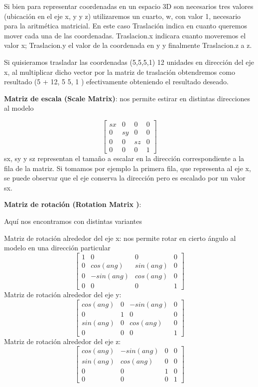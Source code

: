 \documentclass[a4paper]{article}
\begin{document}
Si bien para representar  coordenadas en un espacio 3D son necesarios tres valores (ubicación en el eje x, y y z) utilizaremos un cuarto, w, con valor 1, necesario para la aritmética matricial. En este caso Traslación indica en cuanto queremos mover cada una de las coordenadas. Traslacion.x indicara cuanto moveremos el valor x;  Traslacion.y el valor de la coordenada en y y finalmente Traslacion.z a z.
\par Si quisieramos trasladar las coordenadas (5,5,5,1) 12 unidades en dirección del eje x, al multiplicar dicho vector por la matriz de traslación obtendremos como resultado (5 + 12, 5 5, 1 ) efectivamente obteniendo el resultado deseado.  

\textbf{Matriz de escala (Scale Matrix)}: nos permite estirar en distintas direcciones al modelo
 
\[
\begin{bmatrix}
sx & 0 & 0 & 0 \\
0 & sy & 0 & 0 \\
0 & 0 & sz & 0 \\
0 & 0 & 0 & 1  
\end{bmatrix}
\]
sx, sy y sz representan el tamaño a escalar en la dirección correspondiente a la fila de la matriz. Si tomamos por ejemplo la primera fila, que representa al eje x, se puede observar que el eje conserva la dirección pero es escalado por un valor sx. 



\textbf{Matriz de rotación (Rotation Matrix )}:


 Aquí nos encontramos con distintas variantes 
 
 
 
Matriz de rotación alrededor del eje x: nos permite rotar en cierto ángulo al modelo en una dirección particular
\[
\begin{bmatrix}
1 & 0 & 0 & 0 \\
0 & cos(ang) & sin(ang) & 0 \\
0 & -sin(ang) & cos(ang) & 0 \\
0 & 0 & 0 & 1  
\end{bmatrix}
\]
Matriz de rotación alrededor del eje y:
\[
\begin{bmatrix}
cos(ang) & 0 & -sin(ang) & 0 \\
0 & 1 & 0 & 0 \\
sin(ang) & 0 & cos(ang) & 0 \\
0 & 0 & 0 & 1  
\end{bmatrix}
\]
Matriz de rotación alrededor del eje z:
\[
\begin{bmatrix}
cos(ang) & -sin(ang) & 0 & 0 \\
sin(ang) & cos(ang) & 0 & 0 \\
0 & 0 & 1 & 0 \\
0 & 0 & 0 & 1  
\end{bmatrix}
\]
\end{document}
